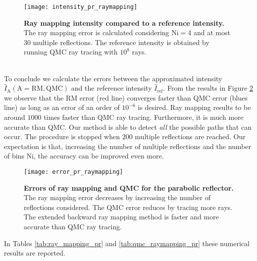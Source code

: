 \begin{figure}[t]
  \begin{center}
  \texttt{[image: intensity\_pr\_raymapping]}
  \end{center}
  \caption{\textbf{Ray mapping intensity compared to a reference intensity.}
The ray mapping error is calculated considering $\textrm{Ni}=4$ and at most $30$ multiple reflections. The reference intensity is obtained by running QMC ray tracing with $10^8$ rays.}
\label{fig:intensity_pr_raymapping}
 \end{figure}
\\ \indent
To conclude we calculate the errors between the approximated intensity $\hat{I}_{\textrm{A}} (\textrm{A}=\textrm{RM}, \textrm{QMC})$ and the reference intensity $\hat{I}_{\textrm{ref}}$. From the results in Figure \ref{fig:error_raymapping_pr} we observe that the RM error (red line) converges faster than QMC error (blues line) as long as an error of an order of $10^{-6}$ is desired. Ray mapping results to be around $1000$ times faster than QMC ray tracing. Furthermore, it is much more accurate than QMC. Our method is able to detect \textit{all} the possible paths that can occur. The procedure is stopped when $200$ multiple reflections are reached. Our expectation is that, increasing the number of multiple reflections and the number of bins $\textrm{Ni}$, the accuracy can be improved even more.
\begin{figure}[h]
  \begin{center}
  \texttt{[image: error\_pr\_raymapping]}
  \end{center}
  \caption{\textbf{Errors of ray mapping and QMC for the parabolic reflector.}
The ray mapping error decreases by increasing the number of reflections considered.
The QMC error reduces by tracing more rays.
 The extended backward ray mapping method is faster and more accurate than QMC ray tracing.}
\label{fig:error_raymapping_pr}
 \end{figure}
In Tables \ref{tab:ray_mapping_pr} and \ref{tab:qmc_raymapping_pr} these numerical results are reported.
